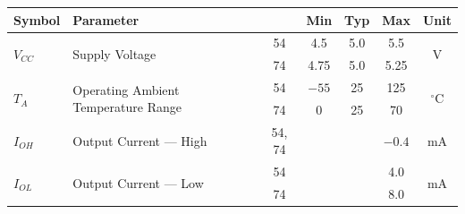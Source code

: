 \begingroup\gusttekst\renewcommand{\arraystretch}{1.25}\setlength{\tabcolsep}{5pt}
\begin{tabularx}{\linewidth}{|l|X|c|c|c|c|c|}\hline
Symbol&Parameter&&Min&Typ&Max&Unit\\\hline
\multirow{2}{*}{$V_{CC}$}&\multirow{2}{*}{Supply Voltage}&54&4.5&5.0&5.5&\multirow{2}{*}{V}\\
&&74&4.75&5.0&5.25&\\\hline
\multirow{2}{*}{$T_A$}&\multirow{2}{*}{Operating Ambient Temperature Range}&54&$-55$&25&125&\multirow{2}{*}{$^\circ$C}\\
&&74&0&25&70&\\\hline
$I_{OH}$&Output Current --- High&54, 74&&&$-0.4$&mA\\\hline
\multirow{2}{*}{$I_{OL}$}&\multirow{2}{*}{Output Current --- Low}&54&&&4.0&\multirow{2}{*}{mA}\\
&&74&&&8.0&\\\hline
\end{tabularx}\endgroup
